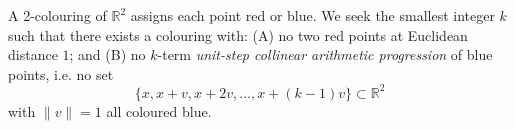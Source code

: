 A 2-colouring of $\mathbb{R}^2$ assigns each point red or blue.
We seek the smallest integer $k$ such that there exists a colouring with:
(A) no two red points at Euclidean distance $1$; and
(B) no $k$-term \emph{unit-step collinear arithmetic progression} of blue points, i.e. no set
\[
\{x, x+v, x+2v,\dots,x+(k-1)v\}\subset \mathbb{R}^2
\]
with $\|v\|=1$ all coloured blue.
